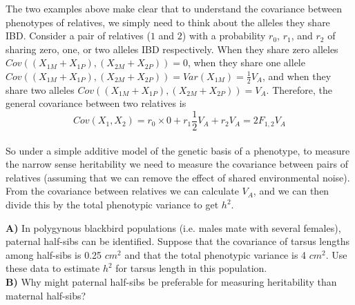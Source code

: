 The two examples above make clear that to understand the covariance between
phenotypes of relatives, we simply need to think about the alleles they
share IBD. Consider a pair of relatives ($1$ and $2$) with a probability $r_0$,
$r_1$, and $r_2$ of sharing zero, one, or two alleles IBD
respectively. When they share zero alleles
$Cov((X_{1M}+X_{1P}),(X_{2M}+X_{2P}))=0$, when they share one allele
$Cov((X_{1M}+X_{1P}),(X_{2M}+X_{2P}))=
Var(X_{1M})=\frac{1}{2}V_A$, and when they share two alleles $Cov((X_{1M}+X_{1P}),(X_{2M}+X_{2P}))=
V_A$. Therefore, the general covariance between two
relatives is
\begin{equation}
Cov(X_1,X_2) = r_0 \times 0 + r_1 \frac{1}{2}V_A + r_2  V_A =
2 F_{1,2} V_A  \label{additive_covar_general_rellys}
\end{equation}\\
So under a simple additive model of the genetic basis of a phenotype,
to measure the narrow sense heritability we need to measure the
covariance between pairs of relatives (assuming that we can remove the effect of
shared environmental noise). From the covariance between relatives we
can calculate $V_A$, and we can then divide this by the total phenotypic
variance to get $h^2$. \\



\begin{question}
{\bf A)} In polygynous blackbird populations (i.e. males mate with
several females), paternal half-sibs can be identified.  Suppose that
the covariance of tarsus lengths among half-sibs is 0.25 $cm^2$ and
that the total phenotypic variance is 4 $cm^2$.  Use these data to
estimate $h^2$ for tarsus length in this population. \\

{\bf B)} Why might paternal half-sibs be preferable for measuring
heritability than maternal half-sibs? 
\end{question}

